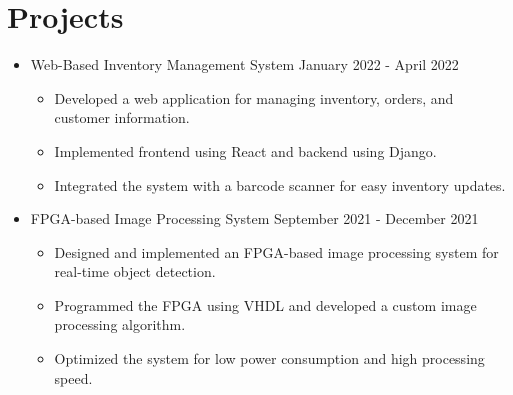 \documentclass[a4paper,12pt]{article} %
\begin{document}
\section*{Projects}
\begin{itemize}[leftmargin=*]
    \item Web-Based Inventory Management System \hfill January 2022 - April 2022
          \begin{itemize}
              \item Developed a web application for managing inventory, orders, and customer information.
              \item Implemented frontend using React and backend using Django.
              \item Integrated the system with a barcode scanner for easy inventory updates.
          \end{itemize}
    \item FPGA-based Image Processing System \hfill September 2021 - December 2021
          \begin{itemize}
              \item Designed and implemented an FPGA-based image processing system for real-time object detection.
              \item Programmed the FPGA using VHDL and developed a custom image processing algorithm.
              \item Optimized the system for low power consumption and high processing speed.
          \end{itemize}
\end{itemize}
\end{document}
